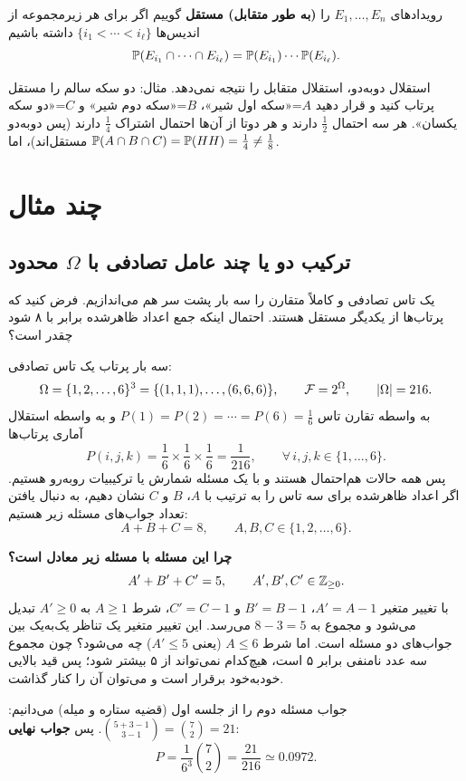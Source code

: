 \begin{definition}
رویدادهای $E_1,\ldots,E_n$ را \textbf{(به طور متقابل) مستقل} گوییم اگر برای هر زیرمجموعه از اندیس‌ها $\{i_1<\cdots<i_\ell\}$ داشته باشیم
\[\mathbb{P}(E_{i_1}\cap\cdots\cap E_{i_\ell})=\mathbb{P}(E_{i_1})\cdots\mathbb{P}(E_{i_\ell}).\]
\end{definition}

\begin{warning}
\warntitle استقلال دوبه‌دو، استقلال متقابل را نتیجه نمی‌دهد. مثال: دو سکه سالم را مستقل پرتاب کنید و قرار دهید $A$=«سکه اول شیر»، $B$=«سکه دوم شیر» و $C$=«دو سکه یکسان». هر سه احتمال $\frac12$ دارند و هر دوتا از آن‌ها احتمال اشتراک $\frac14$ دارند (پس دوبه‌دو مستقل‌اند)، اما $\mathbb{P}(A\cap B\cap C)=\mathbb{P}(HH)=\frac14\neq\frac18$.
\end{warning}

\section{چند مثال}

\subsection{ترکیب دو یا چند عامل تصادفی با $\Omega$ محدود}

\begin{example}
یک تاس تصادفی و کاملاً متقارن را سه بار پشت سر هم می‌اندازیم. فرض کنید که پرتاب‌ها از یکدیگر مستقل هستند. احتمال اینکه جمع اعداد ظاهرشده برابر با ۸ شود چقدر است؟
\begin{solution}
سه بار پرتاب یک تاس تصادفی:
\[
\Omega=\{1,2,\ldots,6\}^3=\{(1,1,1),\ldots,(6,6,6)\},\qquad \mathcal{F}=2^\Omega,\qquad |\Omega|=216 .
\]
به واسطه تقارن تاس $P(1)=P(2)=\cdots=P(6)=\frac16$ و به واسطه استقلال آماری پرتاب‌ها
\[
P(i,j,k)=\frac16\times\frac16\times\frac16=\frac1{216},\qquad \forall\, i,j,k\in\{1,\ldots,6\}.
\]
پس همه حالات هم‌احتمال هستند و با یک مسئله شمارش یا ترکیبیات روبه‌رو هستیم. اگر اعداد ظاهرشده برای سه تاس را به ترتیب با $A$، $B$ و $C$ نشان دهیم، به دنبال یافتن تعداد جواب‌های مسئله زیر هستیم:
\[A+B+C=8,\qquad A,B,C\in\{1,2,\ldots,6\}.\]

\textbf{چرا این مسئله با مسئله زیر معادل است؟}
\[A'+B'+C'=5,\qquad A',B',C'\in\mathbb{Z}_{\ge0}.\]
با تغییر متغیر $A'=A-1$، $B'=B-1$ و $C'=C-1$، شرط $A\ge1$ به $A'\ge0$ تبدیل می‌شود و مجموع به $8-3=5$ می‌رسد. این تغییر متغیر یک تناظر یک‌به‌یک بین جواب‌های دو مسئله است. اما شرط $A\le 6$ (یعنی $A'\le5$) چه می‌شود؟ چون مجموع سه عدد نامنفی برابر ۵ است، هیچ‌کدام نمی‌تواند از ۵ بیشتر شود؛ پس قید بالایی خودبه‌خود برقرار است و می‌توان آن را کنار گذاشت.

جواب مسئله دوم را از جلسه اول (قضیه ستاره و میله) می‌دانیم: $\binom{5+3-1}{3-1}=\binom72=21$. پس \textbf{جواب نهایی}:
\[
P=\frac{1}{6^3}\binom72=\frac{21}{216}\simeq0.0972 .
\]
\end{solution}
\end{example}

